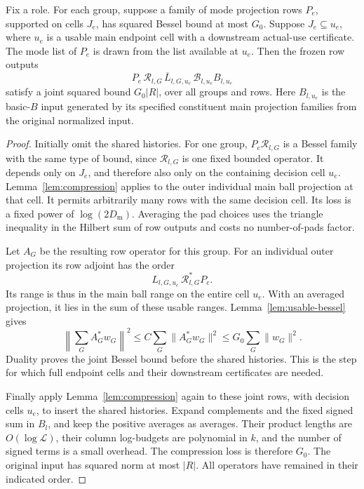 \begin{lemma}
\label{lem:lifted-row-compression}
Fix a role.  For each group, suppose a family of mode projection
rows \(P_e\), supported on cells \(J_e\), has squared Bessel bound
at most \(G_0\).  Suppose \(J_e\subseteq u_e\), where \(u_e\) is a
usable main endpoint cell with a downstream actual-use certificate.
The mode list of \(P_e\) is drawn from the list available at \(u_e\).
Then the frozen row outputs
\[
 P_e\,\mathscr R_{l,G}\,
       \overline L_{l,G,u_e}\,\mathcal B_{l,u_e}B_{l,u_e}
\]
satisfy a joint squared bound \(G_0|R|\), over all groups and rows.
Here \(B_{l,u_e}\) is the basic-\(B\) input generated by its specified
constituent main projection families from the original normalized input.
\end{lemma}

\begin{proof}
Initially omit the shared histories.  For one group,
\(P_e\mathscr R_{l,G}\) is a Bessel family with the same type of
bound, since \(\mathscr R_{l,G}\) is one fixed bounded operator.
It depends only on \(J_e\), and therefore also only on the
containing decision cell \(u_e\).  Lemma~\ref{lem:compression}
applies to the outer individual main ball projection at that cell.
It permits arbitrarily many rows with the same decision cell.
Its loss is a fixed power of \(\log(2D_{\mathrm m})\).
Averaging the pad choices uses the triangle inequality in the
Hilbert sum of row outputs and costs no number-of-pads factor.

Let \(A_G\) be the resulting row operator for this group.
For an individual outer projection its row adjoint has the order
\[
 L_{l,G,u_e}\,\mathscr R_{l,G}^*P_e.
\]
Its range is thus in the main ball range on the entire cell
\(u_e\).  With an averaged projection, it lies in the sum of these
usable ranges.  Lemma~\ref{lem:usable-bessel} gives
\[
 \left\|\sum_G A_G^*w_G\right\|^2
       \le C\sum_G\|A_G^*w_G\|^2
       \le G_0\sum_G\|w_G\|^2.
\]
Duality proves the joint Bessel bound before the shared histories.
This is the step for which full endpoint cells and their downstream
certificates are needed.

Finally apply Lemma~\ref{lem:compression} again to these joint rows,
with decision cells \(u_e\), to insert the shared histories.
Expand complements and the fixed signed sum in \(B_l\), and keep
the positive averages as averages.  Their product lengths are
\(O(\log\mathcal L)\), their column log-budgets are polynomial in
\(k\), and the number of signed terms is a small overhead.
The compression loss is therefore \(G_0\).
The original input has squared norm at most \(|R|\).
All operators have remained in their indicated order.
\end{proof}

